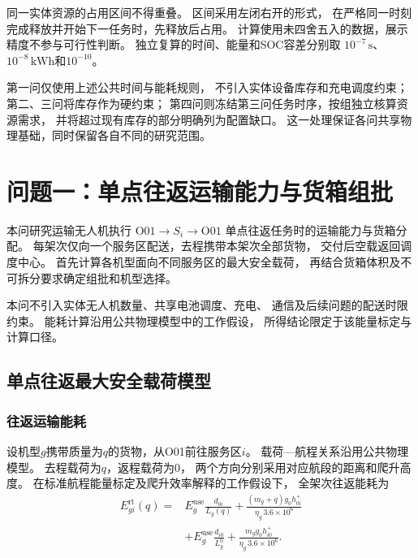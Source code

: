 \documentclass[bwprint]{gmcmthesis}
\begin{document}
同一实体资源的占用区间不得重叠。
区间采用左闭右开的形式，
在严格同一时刻完成释放并开始下一任务时，先释放后占用。
计算使用未四舍五入的数据，展示精度不参与可行性判断。
独立复算的时间、能量和SOC容差分别取
$10^{-7}\,\mathrm{s}$、
$10^{-8}\,\mathrm{kWh}$和$10^{-10}$。

第一问仅使用上述公共时间与能耗规则，
不引入实体设备库存和充电调度约束；
第二、三问将库存作为硬约束；
第四问则冻结第三问任务时序，按组独立核算资源需求，
并将超过现有库存的部分明确列为配置缺口。
这一处理保证各问共享物理基础，同时保留各自不同的研究范围。


\section{问题一：单点往返运输能力与货箱组批}

本问研究运输无人机执行
$\mathrm{O01}\rightarrow S_i\rightarrow\mathrm{O01}$
单点往返任务时的运输能力与货箱分配。
每架次仅向一个服务区配送，去程携带本架次全部货物，
交付后空载返回调度中心。
首先计算各机型面向不同服务区的最大安全载荷，
再结合货箱体积及不可拆分要求确定组批和机型选择。

本问不引入实体无人机数量、共享电池调度、充电、
通信及后续问题的配送时限约束。
能耗计算沿用公共物理模型中的工作假设，
所得结论限定于该能量标定与计算口径。

\subsection{单点往返最大安全载荷模型}

\subsubsection{往返运输能耗}

设机型$g$携带质量为$q$的货物，从O01前往服务区$i$。
载荷—航程关系沿用公共物理模型。
去程载荷为$q$，返程载荷为0，
两个方向分别采用对应航段的距离和爬升高度。
在标准航程能量标定及爬升效率解释的工作假设下，
全架次往返能耗为
\begin{equation}
\begin{aligned}
    E_{gi}^{\mathrm{rt}}(q)
    ={}&
    E_g^{\mathrm{use}}\frac{d_{0i}}{L_g(q)}
    +
    \frac{(m_g+q)g_0h_{0i}^{+}}
    {\eta_g\,3.6\times10^6}
    \\
    &+
    E_g^{\mathrm{use}}\frac{d_{i0}}{L_g^0}
    +
    \frac{m_g g_0h_{i0}^{+}}
    {\eta_g\,3.6\times10^6}.
\end{aligned}
\label{eq:q1_roundtrip_energy}
\end{equation}
\end{document}
